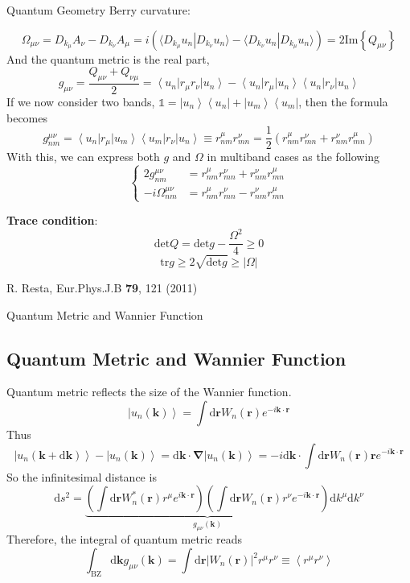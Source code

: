 \documentclass[professionalfont]{beamer}
\newcommand{\anglelr}[1]{\left\langle #1 \right\rangle}
\newcommand{\abs}[1]{\left| #1 \right|}
\newcommand{\lr}[1]{\left(#1\right)}
\newcommand{\lrg}[1]{\left\{#1\right\}}
\newcommand{\ket}[1]{\left| #1 \right\rangle}
\newcommand{\bra}[1]{\left\langle #1 \right|}
\newcommand{\braket}[2]{\langle #1 | #2\rangle}
\newcommand{\mrm}[1]{\mathrm{#1}}
\newcommand{\bo}[1]{\mathbf{#1}}
\newcommand{\bog}[1]{\boldsymbol{#1}}
\begin{document}
\begin{frame}{Quantum Geometry}
Berry curvature:\
{\tiny
\[
\Omega_{\mu\nu} = D_{k_\mu}A_{\nu} - D_{k_\nu}A_{\mu} = i\lr{\braket{D_{k_\mu}u_n}{D_{k_\nu}u_n} - \braket{D_{k_\nu}u_n}{D_{k_\mu}u_n}} = 2\mrm{Im}\lrg{Q_{\mu\nu}}
\]
And the quantum metric is the real part,
\[
g_{\mu\nu} = \frac{Q_{\mu\nu}+Q_{\nu\mu}}{2} = \bra{u_n}r_\mu r_\nu\ket{u_n} - \bra{u_n}r_\mu\ket{u_n}\bra{u_n} r_\nu\ket{u_n}
\]
If we now consider two bands, $\mathds{1} = \ket{u_n}\bra{u_n} + \ket{u_m}\bra{u_m}$, then the formula becomes
\[
g^{\mu\nu}_{nm} =  \bra{u_n}r_\mu\ket{u_m}\bra{u_m} r_\nu\ket{u_n} \equiv r^{\mu}_{nm}r^{\nu}_{mn} = \frac{1}{2}\lr{r^{\mu}_{nm}r^{\nu}_{mn} + r^{\nu}_{nm}r^{\mu}_{mn}}
\]
With this, we can express both $g$ and $\Omega$ in multiband cases as the following
\[
    \left\{
    \begin{aligned}
    2g^{\mu\nu}_{nm} &= r^\mu_{nm}r^\nu_{mn} + r^\nu_{nm}r^\mu_{mn} \\
     -i\Omega^{\mu\nu}_{nm} &= r^\mu_{nm}r^\nu_{mn} - r^\nu_{nm}r^\mu_{mn}
    \end{aligned}
    \right.
    \]

    \textbf{Trace condition}:
    \[
    \mrm{det}Q = \mrm{det}g - \frac{\Omega^2}{4}\geq 0
    \]
    \[
    \mrm{tr}g \geq 2\sqrt{\mrm{det}g} \geq \abs{\Omega}
    \]
}

{\tiny R. Resta, Eur.Phys.J.B \textbf{79}, 121 (2011)}
\end{frame}
\begin{frame}{Quantum Metric and Wannier Function}
\subsection{Quantum Metric and Wannier Function}
{\footnotesize
Quantum metric reflects the size of the Wannier function.
\[
\ket{u_n(\bo{k})} = \int\mrm{d}\bo{r}W_n(\bo{r})e^{-i\bo{k}\cdot \bo{r}}
\]
Thus
\[
\ket{u_n(\bo{k}+\mrm{d}\bo{k})}-\ket{u_n(\bo{k})} = \mrm{d}\bo{k}\cdot\bog{\nabla}\ket{u_n(\bo{k})} = -i\mrm{d}\bo{k}\cdot\int\mrm{d}\bo{r}W_n(\bo{r})\bo{r}e^{-i\bo{k}\cdot\bo{r}}
\]
So the infinitesimal distance is
\[
\mrm{d}s^2 = \underbrace{\lr{\int\mrm{d}\bo{r}W_n^*(\bo{r})r^\mu e^{i\bo{k}\cdot\bo{r}}}\lr{\int\mrm{d}\bo{r}W_n(\bo{r})r^\nu e^{-i\bo{k}\cdot\bo{r}}}}_{g_{\mu\nu}(\bo{k})}\mrm{d}k^\mu\mrm{d}k^\nu
\]
Therefore, the integral of quantum metric reads
\[
\int_{\mrm{BZ}}\mrm{d}\bo{k}g_{\mu\nu}(\bo{k}) = \int\mrm{d}\bo{r}\abs{W_n(\bo{r})}^2r^\mu r^\nu \equiv \anglelr{r^\mu r^\nu} 
\]
}
\end{frame}
\end{document}
